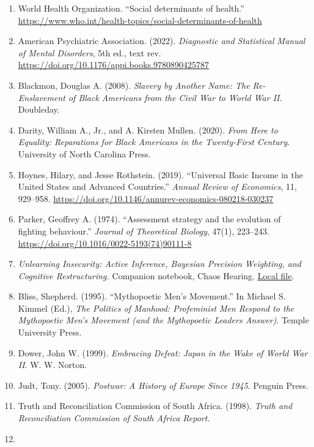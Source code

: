 \documentclass[
  11pt,
  letterpaper,
]{article}
\begin{document}
\begin{enumerate}
  Basic Income Policies and Their Potential for Poverty Reduction.''
  \url{https://www.un.org/development/desa/dspd/2020/02/13609/}
\item
  World Health Organization. ``Social determinants of health.''
  \url{https://www.who.int/health-topics/social-determinants-of-health}
\item
  American Psychiatric Association. (2022). \emph{Diagnostic and
  Statistical Manual of Mental Disorders}, 5th ed., text rev.
  \url{https://doi.org/10.1176/appi.books.9780890425787}
\item
  Blackmon, Douglas A. (2008). \emph{Slavery by Another Name: The
  Re-Enslavement of Black Americans from the Civil War to World War II}.
  Doubleday.
\item
  Darity, William A., Jr., and A. Kirsten Mullen. (2020). \emph{From
  Here to Equality: Reparations for Black Americans in the Twenty-First
  Century}. University of North Carolina Press.
\item
  Hoynes, Hilary, and Jesse Rothstein. (2019). ``Universal Basic Income
  in the United States and Advanced Countries.'' \emph{Annual Review of
  Economics}, 11, 929--958.
  \url{https://doi.org/10.1146/annurev-economics-080218-030237}
\item
  Parker, Geoffrey A. (1974). ``Assessment strategy and the evolution of
  fighting behaviour.'' \emph{Journal of Theoretical Biology}, 47(1),
  223--243. \url{https://doi.org/10.1016/0022-5193(74)90111-8}
\item
  \emph{Unlearning Insecurity: Active Inference, Bayesian Precision
  Weighting, and Cognitive Restructuring.} Companion notebook, Chaos
  Hearing.
  \href{../../../hpc/chaoshearing/notebooks/unlearning_insecurity_active_inference.ipynb}{Local
  file}.
\item
  Bliss, Shepherd. (1995). ``Mythopoetic Men's Movement.'' In Michael S.
  Kimmel (Ed.), \emph{The Politics of Manhood: Profeminist Men Respond
  to the Mythopoetic Men's Movement (and the Mythopoetic Leaders
  Answer)}. Temple University Press.
\item
  Dower, John W. (1999). \emph{Embracing Defeat: Japan in the Wake of
  World War II}. W. W. Norton.
\item
  Judt, Tony. (2005). \emph{Postwar: A History of Europe Since 1945}.
  Penguin Press.
\item
  Truth and Reconciliation Commission of South Africa. (1998).
  \emph{Truth and Reconciliation Commission of South Africa Report}.
\item

\end{enumerate}
\end{document}
